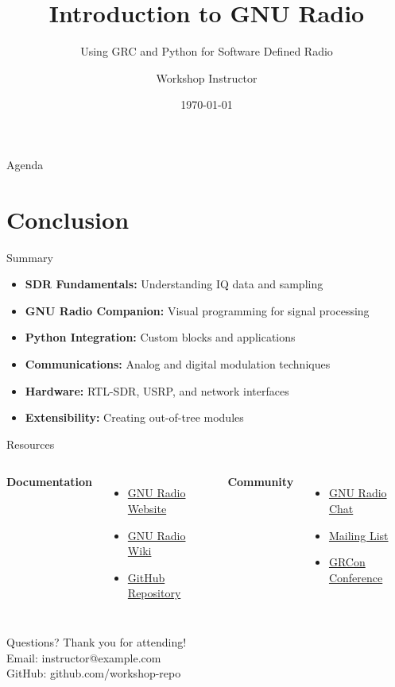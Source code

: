 \documentclass[aspectratio=169,11pt]{beamer}
\title{Introduction to GNU Radio}
\subtitle{Using GRC and Python for Software Defined Radio}
\author{Workshop Instructor}
\institute{GRCon 2025}
\date{\today}
\begin{document}
\begin{frame}
\titlepage
\end{frame}

\begin{frame}{Agenda}
\tableofcontents
\end{frame}








\section{Conclusion}
\begin{frame}{Summary}
\begin{itemize}
    \item \textbf{SDR Fundamentals:} Understanding IQ data and sampling
    \item \textbf{GNU Radio Companion:} Visual programming for signal processing
    \item \textbf{Python Integration:} Custom blocks and applications
    \item \textbf{Communications:} Analog and digital modulation techniques
    \item \textbf{Hardware:} RTL-SDR, USRP, and network interfaces
    \item \textbf{Extensibility:} Creating out-of-tree modules
\end{itemize}
\end{frame}

\begin{frame}{Resources}
\begin{columns}
\textbf{Documentation}
\begin{itemize}
    \item \href{https://www.gnuradio.org}{GNU Radio Website}
    \item \href{https://wiki.gnuradio.org}{GNU Radio Wiki}
    \item \href{https://github.com/gnuradio/gnuradio}{GitHub Repository}
\end{itemize}

\textbf{Community}
\begin{itemize}
    \item \href{https://chat.gnuradio.org}{GNU Radio Chat}
    \item \href{https://lists.gnu.org/mailman/listinfo/discuss-gnuradio}{Mailing List}
    \item \href{https://www.gnuradio.org/grcon/}{GRCon Conference}
\end{itemize}
\end{columns}
\end{frame}

\begin{frame}{Questions?}
\centering
\Large Thank you for attending!\\[1em]
\normalsize
Email: instructor@example.com\\
GitHub: github.com/workshop-repo\\[2em]
\end{frame}
\end{document}
